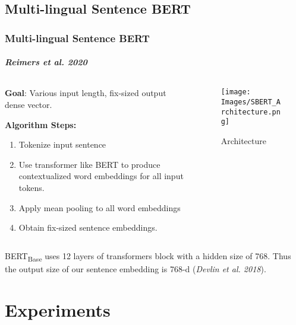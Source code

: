 \documentclass[
	11pt, %
]{beamer}
\begin{document}

\subsection{Multi-lingual Sentence BERT}

\begin{frame}
	\frametitle{Multi-lingual Sentence BERT}
	\framesubtitle{\emph{Reimers et al. 2020}}
	
	\begin{columns}
	    \begin{column}{0.6\textwidth}
	        \textbf{Goal}: Various input length, fix-sized output dense vector.
	        \smallskip
	        
	        \textbf{Algorithm Steps:}
	        \begin{enumerate}
	            \item Tokenize input sentence
	            \item Use transformer like BERT to produce contextualized word embeddings for all input tokens.
	            \item Apply mean pooling to all word embeddings
	            \item Obtain fix-sized sentence embeddings. 
	        \end{enumerate}
	        
	    \end{column}
	    \begin{column}{0.35\textwidth}
	        \begin{figure}
	            \centering
	            \texttt{[image: Images/SBERT\_Architecture.png]}
	            \caption{Architecture}
	            \label{fig:sbert}
	        \end{figure}
	    \end{column}
	\end{columns}
	\smallskip
	\smallskip
	
	BERT\textsubscript{Base} uses 12 layers of transformers block with a hidden size of 768. Thus the output size of our sentence embedding is 768-d (\emph{Devlin et al. 2018}).
\end{frame}


\section{Experiments}
\end{document}
